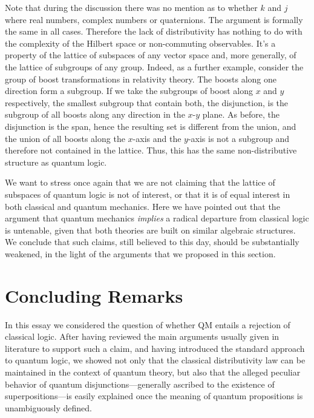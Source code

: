 \documentclass[11pt, executivepaper]{article}
\begin{document}
Note that during the discussion there was no mention as to whether $k$ and $j$ where real numbers, complex numbers or quaternions. The argument is formally the same in all cases. Therefore the lack of distributivity has nothing to do with the complexity of the Hilbert space or non-commuting observables. It's a property of the lattice of subspaces of any vector space and, more generally, of the lattice of subgroups of any group. Indeed, as a further example, consider the group of boost transformations in relativity theory. The boosts along one direction form a subgroup. If we take the subgroups of boost along $x$ and $y$ respectively, the smallest subgroup that contain both, the disjunction, is the subgroup of all boosts along any direction in the $x$-$y$ plane. As before, the disjunction is the span, hence the resulting set is different from the union, and the union of all boosts along the $x$-axis and the $y$-axis is not a subgroup and therefore not contained in the lattice. Thus, this has the same non-distributive structure as quantum logic.

We want to stress once again that we are not claiming that the lattice of subspaces of quantum logic is not of interest, or that it is of equal interest in both classical and quantum mechanics. Here we have pointed out that the argument that quantum mechanics \emph{implies} a radical departure from classical logic is untenable, given that both theories are built on similar algebraic structures. We conclude that such claims, still believed to this day, should be substantially weakened, in the light of the arguments that we proposed in this section. 

\section{Concluding Remarks}
\label{conc}

In this essay we considered the question of whether QM entails a rejection of classical logic. After having reviewed the main arguments usually given in literature to support such a claim, and having introduced the standard approach to quantum logic, we showed not only that the classical distributivity law can be maintained in the context of quantum theory, but also that the alleged peculiar behavior of quantum disjunctions---generally ascribed to the existence of superpositions---is easily explained once the meaning of quantum propositions is unambiguously defined. 
\end{document}
